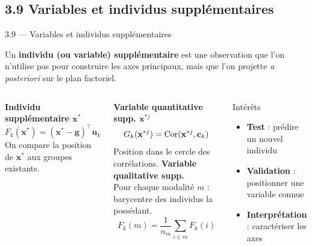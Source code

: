 \subsection{3.9 Variables et individus supplémentaires}
\begin{frame}{3.9 — Variables et individus supplémentaires}
\begin{definition}
Un \textbf{individu (ou variable) supplémentaire} est une observation que
l'on \alert{n'utilise pas} pour construire les axes principaux, mais que
l'on projette \emph{a posteriori} sur le plan factoriel.
\end{definition}

\begin{columns}[T]
\textbf{Individu supplémentaire $\mathbf{x}^*$}
\[
F_k(\mathbf{x}^*) = (\mathbf{x}^* - \mathbf{g})^\top \mathbf{u}_k
\]
On compare la position de $\mathbf{x}^*$ aux groupes existants.

\vspace{0.2cm}
\textbf{Variable quantitative supp. $\mathbf{x}^{*j}$}
\[
G_k(\mathbf{x}^{*j}) = \operatorname{Cor}(\mathbf{x}^{*j}, \mathbf{c}_k)
\]
Position dans le cercle des corrélations.
\textbf{Variable qualitative supp.}\\[0.2cm]
\small Pour chaque modalité $m$ : barycentre des individus la possédant.
\[
F_k(m) = \frac{1}{n_m}\sum_{i \in m} F_k(i)
\]

\begin{block}{Intérêts}
\begin{itemize}\small
  \item \textbf{Test} : prédire un nouvel individu
  \item \textbf{Validation} : positionner une variable connue
  \item \textbf{Interprétation} : caractériser les axes
\end{itemize}
\end{block}
\end{columns}
\end{frame}


